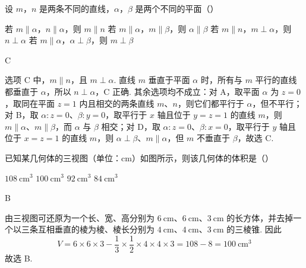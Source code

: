 \begin{problem}
设 \(m\)，\(n\) 是两条不同的直线，\(\alpha\)，\(\beta\) 是两个不同的平面（\quad）

\choices
    {若 \(m\parallel\alpha\)，\(n\parallel\alpha\)，则 \(m\parallel n\)}
    {若 \(m\parallel\alpha\)，\(m\parallel\beta\)，则 \(\alpha\parallel\beta\)}
    {若 \(m\parallel n\)，\(m \perp \alpha\)，则 \(n \perp \alpha\)}
    {若 \(m\parallel\alpha\)，\(\alpha \perp \beta\)，则 \(m \perp \beta\)}

\end{problem}

\begin{answer}
C
\end{answer}

\begin{solution}
选项 C 中，\(m\parallel n\)，且 \(m\perp\alpha\). 直线 \(m\) 垂直于平面 \(\alpha\) 时，所有与 \(m\) 平行的直线都垂直于 \(\alpha\)，所以 \(n\perp\alpha\)，C 正确. 其余选项均不成立：对 A，取平面 \(\alpha\) 为 \(z=0\)，取同在平面 \(z=1\) 内且相交的两条直线 \(m\)、\(n\)，则它们都平行于 \(\alpha\)，但不平行；对 B，取 \(\alpha\colon z=0\)、\(\beta\colon y=0\)，取平行于 \(x\) 轴且位于 \(y=z=1\) 的直线 \(m\)，则 \(m\parallel\alpha\)、\(m\parallel\beta\)，而 \(\alpha\) 与 \(\beta\) 相交；对 D，取 \(\alpha\colon z=0\)、\(\beta\colon x=0\)，取平行于 \(y\) 轴且位于 \(x=z=1\) 的直线 \(m\)，则 \(\alpha\perp\beta\)、\(m\parallel\alpha\)，但 \(m\) 不垂直于 \(\beta\)，故选 C.
\end{solution}

\begin{problem}
已知某几何体的三视图（单位：\(\mathrm{cm}\)）如图所示，则该几何体的体积是（\quad）


\choices
    {\(108\mathrm{~cm}^3\)}
    {\(100\mathrm{~cm}^3\)}
    {\(92\mathrm{~cm}^3\)}
    {\(84\mathrm{~cm}^3\)}

\end{problem}

\begin{answer}
B
\end{answer}

\begin{solution}
由三视图可还原为一个长、宽、高分别为 \(6\mathrm{~cm}\)、\(6\mathrm{~cm}\)、\(3\mathrm{~cm}\) 的长方体，并去掉一个以三条互相垂直的棱为棱、棱长分别为 \(4\mathrm{~cm}\)、\(4\mathrm{~cm}\)、\(3\mathrm{~cm}\) 的三棱锥. 因此
\[
V=6\times6\times3-\frac{1}{3}\times\frac{1}{2}\times4\times4\times3=108-8=100\mathrm{~cm}^3
\]
故选 B.
\end{solution}

